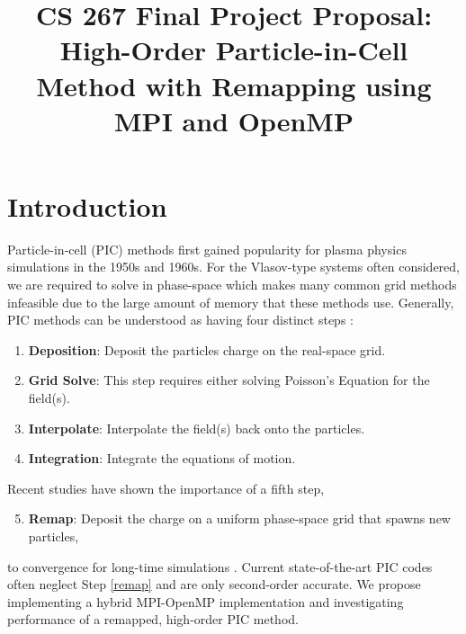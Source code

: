 \documentclass[aps,12pt]{revtex4-1}
\title{CS 267 Final Project Proposal: High-Order Particle-in-Cell Method with Remapping using MPI and OpenMP}
\renewcommand{\=}[1]{\overline{#1}}
\begin{document}
\maketitle


\section{Introduction}

Particle-in-cell (PIC) methods first gained popularity for plasma physics simulations in the 1950s and 1960s. 
For the Vlasov-type systems often considered, we are required to solve in phase-space which makes many common grid methods infeasible due to the large amount of memory that these methods use. 
Generally, PIC methods can be understood as having four distinct steps \cite{hockney1988computer, birdsall2004plasma}: 
\begin{enumerate}
\item \textbf{Deposition}: Deposit the particles charge on the real-space grid.\label{deposition}
\item \textbf{Grid Solve}: This step requires either solving Poisson's Equation for the field(s).\label{gridsolve}
\item \textbf{Interpolate}: Interpolate the field(s) back onto the particles.\label{interpolation}
\item \textbf{Integration}: Integrate the equations of motion.\label{interpolation} 
\end{enumerate}
Recent studies have shown the importance of a fifth step, 
\begin{enumerate}
\setcounter{enumi}{4}
\item \textbf{Remap}: Deposit the charge on a uniform phase-space grid that spawns new particles,\label{remap}
\end{enumerate}
to convergence for long-time simulations \cite{wang2011particle, myers2016convergence}. 
Current state-of-the-art PIC codes often neglect Step \ref{remap} and are only second-order accurate. We propose implementing a hybrid MPI-OpenMP implementation and investigating performance of a remapped, high-order PIC method.  
\end{document}
